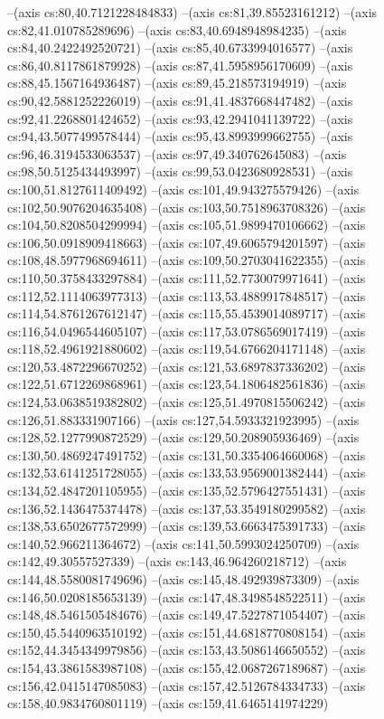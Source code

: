 --(axis cs:80,40.7121228484833)
--(axis cs:81,39.85523161212)
--(axis cs:82,41.010785289696)
--(axis cs:83,40.6948948984235)
--(axis cs:84,40.2422492520721)
--(axis cs:85,40.6733994016577)
--(axis cs:86,40.8117861879928)
--(axis cs:87,41.5958956170609)
--(axis cs:88,45.1567164936487)
--(axis cs:89,45.218573194919)
--(axis cs:90,42.5881252226019)
--(axis cs:91,41.4837668447482)
--(axis cs:92,41.2268801424652)
--(axis cs:93,42.2941041139722)
--(axis cs:94,43.5077499578444)
--(axis cs:95,43.8993999662755)
--(axis cs:96,46.3194533063537)
--(axis cs:97,49.340762645083)
--(axis cs:98,50.5125434493997)
--(axis cs:99,53.0423680928531)
--(axis cs:100,51.8127611409492)
--(axis cs:101,49.943275579426)
--(axis cs:102,50.9076204635408)
--(axis cs:103,50.7518963708326)
--(axis cs:104,50.8208504299994)
--(axis cs:105,51.9899470106662)
--(axis cs:106,50.0918909418663)
--(axis cs:107,49.6065794201597)
--(axis cs:108,48.5977968694611)
--(axis cs:109,50.2703041622355)
--(axis cs:110,50.3758433297884)
--(axis cs:111,52.7730079971641)
--(axis cs:112,52.1114063977313)
--(axis cs:113,53.4889917848517)
--(axis cs:114,54.8761267612147)
--(axis cs:115,55.4539014089717)
--(axis cs:116,54.0496544605107)
--(axis cs:117,53.0786569017419)
--(axis cs:118,52.4961921880602)
--(axis cs:119,54.6766204171148)
--(axis cs:120,53.4872296670252)
--(axis cs:121,53.6897837336202)
--(axis cs:122,51.6712269868961)
--(axis cs:123,54.1806482561836)
--(axis cs:124,53.0638519382802)
--(axis cs:125,51.4970815506242)
--(axis cs:126,51.883331907166)
--(axis cs:127,54.5933321923995)
--(axis cs:128,52.1277990872529)
--(axis cs:129,50.208905936469)
--(axis cs:130,50.4869247491752)
--(axis cs:131,50.3354064660068)
--(axis cs:132,53.6141251728055)
--(axis cs:133,53.9569001382444)
--(axis cs:134,52.4847201105955)
--(axis cs:135,52.5796427551431)
--(axis cs:136,52.1436475374478)
--(axis cs:137,53.3549180299582)
--(axis cs:138,53.6502677572999)
--(axis cs:139,53.6663475391733)
--(axis cs:140,52.966211364672)
--(axis cs:141,50.5993024250709)
--(axis cs:142,49.30557527339)
--(axis cs:143,46.964260218712)
--(axis cs:144,48.5580081749696)
--(axis cs:145,48.492939873309)
--(axis cs:146,50.0208185653139)
--(axis cs:147,48.3498548522511)
--(axis cs:148,48.5461505484676)
--(axis cs:149,47.5227871054407)
--(axis cs:150,45.5440963510192)
--(axis cs:151,44.6818770808154)
--(axis cs:152,44.3454349979856)
--(axis cs:153,43.5086146650552)
--(axis cs:154,43.3861583987108)
--(axis cs:155,42.0687267189687)
--(axis cs:156,42.0415147085083)
--(axis cs:157,42.5126784334733)
--(axis cs:158,40.9834760801119)
--(axis cs:159,41.6465141974229)
